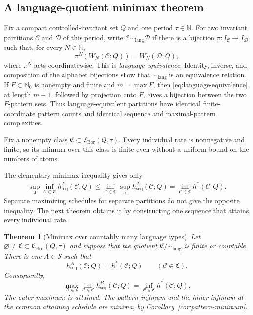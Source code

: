 \documentclass[11pt,reqno]{amsart}
\numberwithin{equation}{section}
\newtheorem{theorem}{Theorem}[section]
\theoremstyle{definition}
\theoremstyle{definition}
\newcommand{\N}{\mathbb N}
\newcommand{\Nzero}{\mathbb N_0}
\newcommand{\C}{\mathcal C}
\newcommand{\D}{\mathcal D}
\newcommand{\hseq}{h_{\mathrm{seq}}}
\newcommand{\hpat}{h^{*}}
\newcommand{\Bor}{\mathrm{Bor}}
\newcommand{\lang}{\mathrm{lang}}
\begin{document}
\subsection{A language-quotient minimax theorem}\label{sec:minimax}

Fix a compact controlled-invariant set $Q$ and one period $\tau\in\N$.
For two invariant partitions $\C$ and $\D$ of this period, write
$\C\sim_{\lang}\D$ if there is a bijection
$\pi:I_\C\to I_\D$ such that, for every $N\in\N$,
\begin{equation}\label{eq:language-equivalence}
 \pi^N(W_N(\C;Q))=W_N(\D;Q),
\end{equation}
where $\pi^N$ acts coordinatewise.  This is \emph{language equivalence}.
Identity, inverse, and composition of the alphabet bijections show that
$\sim_{\lang}$ is an equivalence relation.  If $F\subset\Nzero$ is nonempty and finite and
$m=\max F$, then \eqref{eq:language-equivalence} at length $m+1$, followed by
projection onto $F$, gives a bijection between the two $F$-pattern sets.
Thus language-equivalent partitions have identical finite-coordinate pattern
counts and identical sequence and maximal-pattern complexities.

Fix a nonempty class $\mathfrak C\subset\mathfrak C_{\Bor}(Q,\tau)$.
Every individual rate is nonnegative and finite, so its infimum over
this class is finite even without a uniform bound on the numbers of atoms.

The elementary minimax inequality gives only
\begin{align*}
 \sup_A\inf_{\C\in\mathfrak C}\hseq^A(\C;Q)
 \le\inf_{\C\in\mathfrak C}\sup_A\hseq^A(\C;Q)
 =\inf_{\C\in\mathfrak C}\hpat(\C;Q).
\end{align*}
Separate maximizing schedules for separate partitions do not give the
opposite inequality. The next theorem obtains it by constructing one
sequence that attains every individual rate.

\begin{theorem}[Minimax over countably many language types]\label{thm:B}
Let $\varnothing\ne\mathfrak C\subset\mathfrak C_{\Bor}(Q,\tau)$ and suppose
that the quotient $\mathfrak C/{\sim_{\lang}}$ is finite or countable.  There
is one $A\in\mathscr S$ such that
\begin{equation}\label{eq:pointwise-class-attainment}
 \hseq^A(\C;Q)=\hpat(\C;Q)
 \qquad(\C\in\mathfrak C).
\end{equation}
Consequently,
\begin{equation}\label{eq:minimax}
 \max_{B\in\mathscr S}\inf_{\C\in\mathfrak C}
 \hseq^B(\C;Q)
 =\inf_{\C\in\mathfrak C}\hpat(\C;Q).
\end{equation}
The outer maximum is attained. The pattern infimum and the inner infimum at the common attaining schedule are minima, by Corollary~\ref{cor:pattern-minimum}.
\end{theorem}
\end{document}
